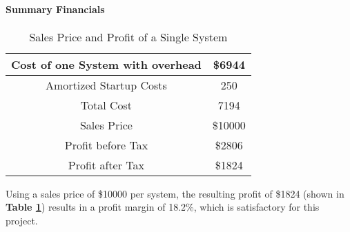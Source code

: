 \documentclass[PPFS.tex]{template/subfiles}
\begin{document}
        \paragraph{Summary Financials}
        
		\begin{table}[H]
			\begin{center}
				\caption{Sales Price and Profit of a Single System}
				\label{tab:SalesPrice}
				\begin{tabular}{|c|c|}
					\hline
					Cost of one System with overhead & \$6944\\
					\hline
					Amortized Startup Costs & 250\\
					\hline
					Total Cost & 7194\\
					\hline
					Sales Price & \$10000\\
					\hline
					Profit before Tax& \$2806\\
					\hline
					Profit after Tax& \$1824\\
					\hline
				\end{tabular}
			\end{center}
		\end{table}
        
        Using a sales price of \$10000 per system, the resulting profit of \$1824 (shown in \textbf{Table \ref{tab:SalesPrice}}) results in a profit margin of 18.2\%, which is satisfactory for this project.
        
        
\end{document}
